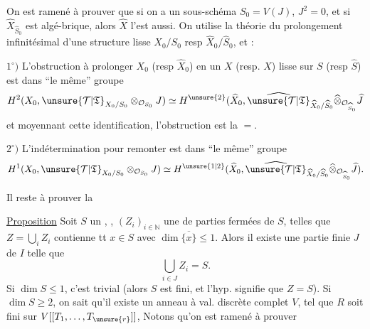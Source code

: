 On est ramené à prouver que si  on a un sous-schéma $S_0=V(J)$, $J^2=0$, et si $\widehat X_{\widehat S_0}$ est algé-brique, alors $\widehat X$ l'est aussi. On utilise la théorie du prolongement infinitésimal d'une structure lisse $X_0/S_0$ resp $\widehat X_0/\widehat S_0$, et :

$1^\circ)$ L'obstruction à prolonger $X_0$ (resp $\widehat X_0$) en un $X$ (resp. $\widehat X$) lisse sur $S$ (resp $\widehat S$) est dans ``le même'' groupe
\[
H^2(X_0,\unsure{\mathcal T|\mathfrak T}_{X_0/S_0}\otimes_{\mathcal O_{S_0}}J)\simeq H^{\unsure{2}}(\widehat X_0,\widehat{\unsure{\mathcal T|\mathfrak T}}_{\widehat X_0/\widehat S_0}\widehat\otimes_{\mathcal O_{\widehat S_0}}\widehat J
\]
et moyennant cette identification, l'obstruction est la $=$.

$2^\circ)$ L'indétermination pour remonter est dans ``le même'' groupe
\[
H^1(X_0,\unsure{\mathcal T|\mathfrak T}_{X_0/S_0}\otimes_{\mathcal O_{S_0}}J)\simeq H^{\unsure{1|2}}(\widehat X_0,\widehat{\unsure{\mathcal T|\mathfrak T}}_{\widehat X_0/\widehat S_0}\widehat\otimes_{\mathcal O_{\widehat S_0}}\widehat J).
\]

Il reste à prouver la

\uline{Proposition} Soit $S$ un  , , $(Z_i)_{i\in\mathbb N}$ une   de parties fermées  de $S$, telles que $Z=\bigcup_i Z_i$ contienne tt $x\in S$ avec $\dim\overline{\{x\}}\leq1$. Alors il existe une partie finie $J$ de $I$ telle que
\[
\bigcup_{i\in J}Z_i=S.
\]
Si $\dim S\leq1$, c'est trivial (alors  $S$ est fini, et l'hyp. signifie que $Z=S$). Si $\dim S\geq2$, on sait qu'il existe un anneau à val. discrète complet $V$,  tel que $R$ soit fini sur $V[[T_1,\ldots,T_{\unsure{r}}]]$,  Notons qu'on est ramené  à prouver

